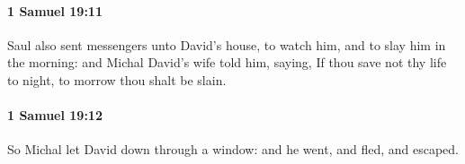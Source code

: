 		\paragraph{1 Samuel 19:11} %
			\label{1SAMUEL-19-11}

			Saul also sent messengers unto David’s house, to watch him, and to slay him in the morning: and Michal David’s wife told him, saying, If thou save not thy life to night, to morrow thou shalt be slain.


		\paragraph{1 Samuel 19:12} %
			\label{1SAMUEL-19-12}

			So Michal let David down through a window: and he went, and fled, and escaped.


